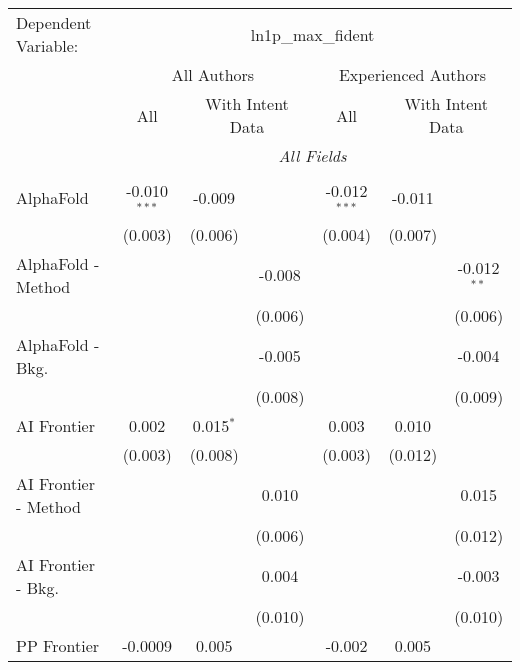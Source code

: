 \begingroup
\centering
\begin{tabular}{lcccccc}
   \tabularnewline \midrule \midrule
   Dependent Variable: & \multicolumn{6}{c}{ln1p\_max\_fident}\\
 & \multicolumn{3}{c}{All Authors} & \multicolumn{3}{c}{Experienced Authors} \\
\cmidrule(lr){2-4} \cmidrule(lr){5-7}
 & \multicolumn{1}{c}{All} & \multicolumn{2}{c}{With Intent Data} & \multicolumn{1}{c}{All} & \multicolumn{2}{c}{With Intent Data} \\
\cmidrule(lr){2-2} \cmidrule(lr){3-4} \cmidrule(lr){5-5} \cmidrule(lr){6-7}
 & \multicolumn{6}{c}{\textit{All Fields}} \\ \\
   AlphaFold            & -0.010$^{***}$ & -0.009      &              & -0.012$^{***}$ & -0.011  &   \\   
                        & (0.003)        & (0.006)     &              & (0.004)        & (0.007) &   \\   
   AlphaFold - Method   &                &             & -0.008       &                &         & -0.012$^{**}$\\   
                        &                &             & (0.006)      &                &         & (0.006)\\   
   AlphaFold - Bkg.     &                &             & -0.005       &                &         & -0.004\\   
                        &                &             & (0.008)      &                &         & (0.009)\\   
   AI Frontier          & 0.002          & 0.015$^{*}$ &              & 0.003          & 0.010   &   \\   
                        & (0.003)        & (0.008)     &              & (0.003)        & (0.012) &   \\   
   AI Frontier - Method &                &             & 0.010        &                &         & 0.015\\   
                        &                &             & (0.006)      &                &         & (0.012)\\   
   AI Frontier - Bkg.   &                &             & 0.004        &                &         & -0.003\\   
                        &                &             & (0.010)      &                &         & (0.010)\\   
   PP Frontier          & -0.0009        & 0.005       &              & -0.002         & 0.005   &   \\   

\end{tabular}
